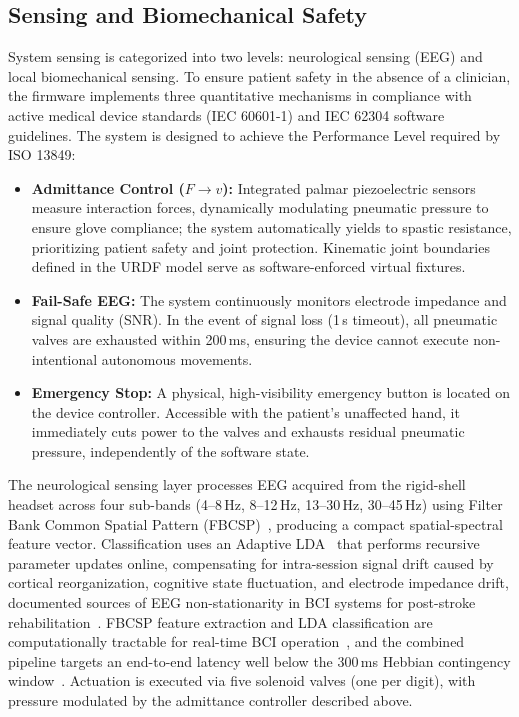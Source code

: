 \documentclass[11pt,a4paper]{article}
\begin{document}
\subsection{Sensing and Biomechanical Safety}

System sensing is categorized into two levels: neurological sensing (EEG) and local biomechanical sensing. To ensure patient safety in the absence of a clinician, the firmware implements three quantitative mechanisms in compliance with active medical device standards (IEC 60601-1) and IEC 62304 software guidelines. The system is designed to achieve the Performance Level required by ISO 13849:

\begin{itemize}
    \item \textbf{Admittance Control ($F \rightarrow v$):} Integrated palmar piezoelectric sensors measure interaction forces, dynamically modulating pneumatic pressure to ensure glove compliance; the system automatically yields to spastic resistance, prioritizing patient safety and joint protection. Kinematic joint boundaries defined in the URDF model serve as software-enforced virtual fixtures.
    \item \textbf{Fail-Safe EEG:} The system continuously monitors electrode impedance and signal quality (SNR). In the event of signal loss (1\,s timeout), all pneumatic valves are exhausted within 200\,ms, ensuring the device cannot execute non-intentional autonomous movements.
    \item \textbf{Emergency Stop:} A physical, high-visibility emergency button is located on the device controller. Accessible with the patient's unaffected hand, it immediately cuts power to the valves and exhausts residual pneumatic pressure, independently of the software state.
\end{itemize}

The neurological sensing layer processes EEG acquired from the
rigid-shell headset across four sub-bands (4--8\,Hz, 8--12\,Hz,
13--30\,Hz, 30--45\,Hz) using Filter Bank Common Spatial Pattern
(FBCSP)~\cite{premchand2025personalized, lu2025exploring},
producing a compact spatial-spectral feature vector.
Classification uses an Adaptive LDA~\cite{wu2024adaptive} that
performs recursive parameter updates online, compensating for
intra-session signal drift caused by cortical reorganization,
cognitive state fluctuation, and electrode impedance drift,
documented sources of EEG non-stationarity in BCI systems for
post-stroke rehabilitation~\cite{wu2024adaptive, lu2025exploring}.
FBCSP feature extraction and LDA classification are
computationally tractable for real-time BCI
operation~\cite{premchand2025personalized, wu2024adaptive},
and the combined pipeline targets an end-to-end latency
well below the 300\,ms Hebbian contingency
window~\cite{krueger2024hebbian}.
Actuation is executed via five solenoid valves (one per digit),
with pressure modulated by the admittance controller described above.
\end{document}
